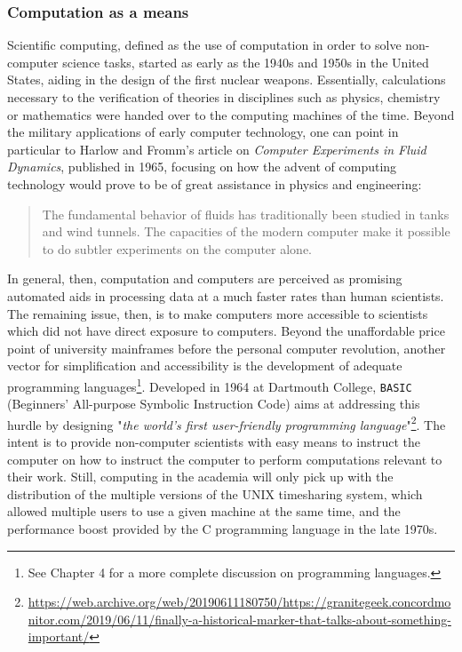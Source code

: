 \subsubsection{Computation as a means}

Scientific computing, defined as the use of computation in order to solve non-computer science tasks, started as early as the 1940s and 1950s in the United States, aiding in the design of the first nuclear weapons\cite{oberkampf_verification_2010}. Essentially, calculations necessary to the verification of theories in disciplines such as physics, chemistry or mathematics were handed over to the computing machines of the time. Beyond the military applications of early computer technology, one can point in particular to Harlow and Fromm's article on \emph{Computer Experiments in Fluid Dynamics}, published in 1965, focusing on how the advent of computing technology would prove to be of great assistance in physics and engineering:

\begin{quote}
  The fundamental behavior of fluids has traditionally been studied in tanks and wind tunnels. The capacities of the modern computer make it possible to do subtler experiments on the computer alone.\cite{harlow_computer_1965}
\end{quote}

In general, then, computation and computers are perceived as promising automated aids in processing data at a much faster rates than human scientists\cite{licklider_man-computer_1960}. The remaining issue, then, is to make computers more accessible to scientists which did not have direct exposure to computers. Beyond the unaffordable price point of university mainframes before the personal computer revolution, another vector for simplification and accessibility is the development of adequate programming languages\footnote{See Chapter 4 for a more complete discussion on programming languages.}. Developed in 1964 at Dartmouth College, \lstinline{BASIC} (Beginners' All-purpose Symbolic Instruction Code) aims at addressing this hurdle by designing "\emph{the world's first user-friendly programming language}"\footnote{\url{https://web.archive.org/web/20190611180750/https://granitegeek.concordmonitor.com/2019/06/11/finally-a-historical-marker-that-talks-about-something-important/}}. The intent is to provide non-computer scientists with easy means to instruct the computer on how to instruct the computer to perform computations relevant to their work. Still, computing in the academia will only pick up with the distribution of the multiple versions of the UNIX timesharing system, which allowed multiple users to use a given machine at the same time, and the performance boost provided by the C programming language in the late 1970s.


